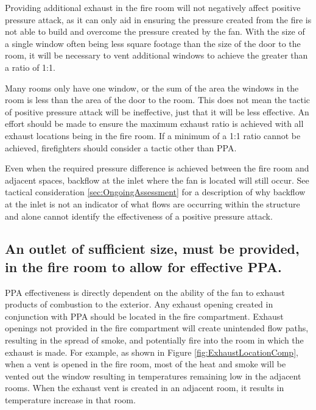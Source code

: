 \documentclass{article}
\begin{document}
Providing additional exhaust in the fire room will not negatively affect positive pressure attack, as it can only aid in ensuring the pressure created from the fire is not able to build and overcome the pressure created by the fan. With the size of a single window often being less square footage than the size of the door to the room, it will be necessary to vent additional windows to achieve the greater than a ratio of 1:1. 

Many rooms only have one window, or the sum of the area the windows in the room is less than the area of the door to the room. This does not mean the tactic of positive pressure attack will be ineffective, just that it will be less effective. An effort should be made to ensure the maximum exhaust ratio is achieved with all exhaust locations being in the fire room. If a minimum of a 1:1 ratio cannot be achieved, firefighters should consider a tactic other than PPA. 

Even when the required pressure difference is achieved between the fire room and adjacent spaces, backflow at the inlet where the fan is located will still occur. See tactical consideration \ref{sec:OngoingAssessment} for a description of why backflow at the inlet is not an indicator of what flows are occurring within the structure and alone cannot identify the effectiveness of a positive pressure attack.

\subsection{An outlet of sufficient size, must be provided, in the fire room to allow for effective PPA.} \label{sec:OutletInFireRoom}
PPA effectiveness is directly dependent on the ability of the fan to exhaust products of combustion to the exterior. Any exhaust opening created in conjunction with PPA should be located in the fire compartment. Exhaust openings not provided in the fire compartment will create unintended flow paths, resulting in the spread of smoke, and potentially fire into the room in which the exhaust is made. For example, as shown in Figure \ref{fig:ExhaustLocationComp}, when a vent is opened in the fire room, most of the heat and smoke will be vented out the window resulting in temperatures remaining low in the adjacent rooms. When the exhaust vent is created in an adjacent room, it results in temperature increase in that room.
\end{document}
